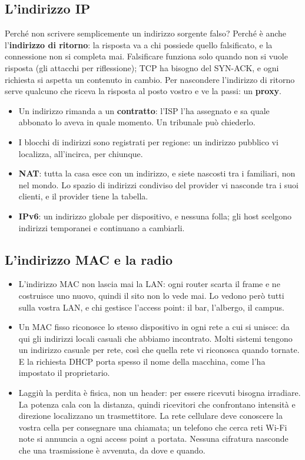 \subsection{L'indirizzo IP}

Perché non scrivere semplicemente un indirizzo sorgente falso? Perché è anche l'\textbf{indirizzo di ritorno}: la risposta va a chi
possiede quello falsificato, e la connessione non si completa mai. Falsificare funziona solo quando non si vuole risposta (gli attacchi
per riflessione); TCP ha bisogno del SYN-ACK, e ogni richiesta si aspetta un contenuto in cambio. Per nascondere l'indirizzo di ritorno
serve qualcuno che riceva la risposta al posto vostro e ve la passi: un \textbf{proxy}.

\begin{itemize}
    \item Un indirizzo rimanda a un \textbf{contratto}: l'ISP l'ha assegnato e sa quale abbonato lo aveva in quale momento. Un tribunale può
          chiederlo.
    \item I blocchi di indirizzi sono registrati per regione: un indirizzo pubblico vi localizza, all'incirca, per chiunque.
    \item \textbf{NAT}: tutta la casa esce con un indirizzo, e siete nascosti tra i familiari, non nel mondo. Lo spazio di indirizzi
          condiviso del provider vi nasconde tra i suoi clienti, e il provider tiene la tabella.
    \item \textbf{IPv6}: un indirizzo globale per dispositivo, e nessuna folla; gli host scelgono indirizzi temporanei e continuano a
          cambiarli.
\end{itemize}

\subsection{L'indirizzo MAC e la radio}

\begin{itemize}
    \item L'indirizzo MAC non lascia mai la LAN: ogni router scarta il frame e ne costruisce uno nuovo, quindi il sito non lo vede mai. Lo
          vedono però tutti sulla vostra LAN, e chi gestisce l'access point: il bar, l'albergo, il campus.
    \item Un MAC fisso riconosce lo stesso dispositivo in ogni rete a cui si unisce: da qui gli indirizzi locali casuali che abbiamo
          incontrato. Molti sistemi tengono un indirizzo casuale per rete, così che quella rete vi riconosca quando tornate. E la richiesta
          DHCP porta spesso il nome della macchina, come l'ha impostato il proprietario.
    \item Laggiù la perdita è fisica, non un header: per essere ricevuti bisogna irradiare. La potenza cala con la distanza, quindi
          ricevitori che confrontano intensità e direzione localizzano un trasmettitore. La rete cellulare deve conoscere la vostra cella
          per consegnare una chiamata; un telefono che cerca reti Wi-Fi note si annuncia a ogni access point a portata. Nessuna cifratura
          nasconde che una trasmissione è avvenuta, da dove e quando.
\end{itemize}

